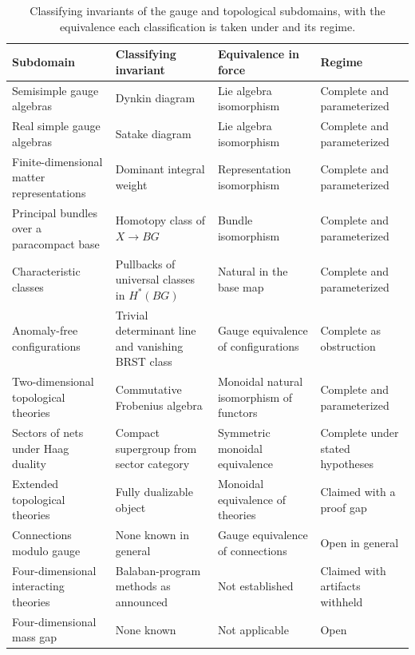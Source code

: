 \documentclass[11pt,letterpaper]{article}
\theoremstyle{definition}
\theoremstyle{remark}
\begin{document}
\begin{table}[ht]
\centering
\small
\caption{Classifying invariants of the gauge and topological subdomains, with the equivalence each classification is taken under and its regime.}
\label{tab:invariants}
\begin{tabularx}{\textwidth}{L{0.20\textwidth} X L{0.24\textwidth} L{0.20\textwidth}}
\toprule
Subdomain & Classifying invariant & Equivalence in force & Regime \\
\midrule
Semisimple gauge algebras & Dynkin diagram & Lie algebra isomorphism & Complete and parameterized \\
\addlinespace
Real simple gauge algebras & Satake diagram & Lie algebra isomorphism & Complete and parameterized \\
\addlinespace
Finite-dimensional matter representations & Dominant integral weight & Representation isomorphism & Complete and parameterized \\
\addlinespace
Principal bundles over a paracompact base & Homotopy class of $X \to BG$ & Bundle isomorphism & Complete and parameterized \\
\addlinespace
Characteristic classes & Pullbacks of universal classes in $H^*(BG)$ & Natural in the base map & Complete and parameterized \\
\addlinespace
Anomaly-free configurations & Trivial determinant line and vanishing BRST class & Gauge equivalence of configurations & Complete as obstruction \\
\addlinespace
Two-dimensional topological theories & Commutative Frobenius algebra & Monoidal natural isomorphism of functors & Complete and parameterized \\
\addlinespace
Sectors of nets under Haag duality & Compact supergroup from sector category & Symmetric monoidal equivalence & Complete under stated hypotheses \\
\addlinespace
Extended topological theories & Fully dualizable object & Monoidal equivalence of theories & Claimed with a proof gap \\
\addlinespace
Connections modulo gauge & None known in general & Gauge equivalence of connections & Open in general \\
\addlinespace
Four-dimensional interacting theories & Balaban-program methods as announced & Not established & Claimed with artifacts withheld \\
\addlinespace
Four-dimensional mass gap & None known & Not applicable & Open \\
\bottomrule
\end{tabularx}
\end{table}
\end{document}
